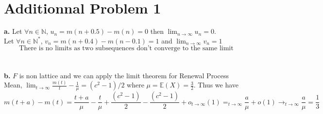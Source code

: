 \documentclass{article}
\begin{document}
\section*{Additionnal Problem 1}
\textbf{a.} Let $\forall n\in\mathbb{N}$, $u_n = m(n+0.5)-m(n) = 0$ then $\lim_{n\to\infty}u_n = 0$.
\\
Let $\forall n\in\mathbb{N}^*$, $v_n = m(n+0.4)-m(n-0.1) = 1$ and $\lim_{n\to\infty}v_n=1$
$$\boxed{\text{There is no limits as two subsequences don't converge to the same limit}}$$
\\\\
\textbf{b.} $F$ is non lattice and we can apply the limit theorem for Renewal Process Mean, $\lim_{t\to\infty} \frac{m(t)}{t} -\frac{1}{\mu}= (c^2-1)/2$ where $\mu = \mathbb{E}(X) = \frac{3}{2}$.
Thus we have $m(t+a)-m(t) = \dfrac{t+a}{\mu}-\dfrac{t}{\mu}+\dfrac{(c^2-1)}{2}-\dfrac{(c^2-1)}{2}+o_{t\to\infty}(1) =_{t\to\infty} \dfrac{a}{\mu}+o(1)\to_{t\to\infty}\dfrac{a}{\mu} = \dfrac{1}{3}$
\end{document}
